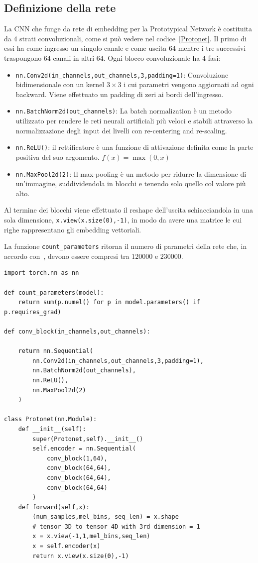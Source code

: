 \documentclass[12pt,a4paper,titlepage]{article}
\begin{document}
\subsection{Definizione della rete}
\label{subsec:definizione_protonet}
La CNN che funge da rete di embedding per la Prototypical Network è costituita da 4 strati convoluzionali, come si può vedere nel codice~\ref{Protonet}. Il primo di essi ha come ingresso un singolo canale e come uscita 64 mentre i tre successivi traspongono 64 canali in altri 64.
Ogni blocco convoluzionale ha 4 fasi:
\begin{itemize}
	\item \texttt{nn.Conv2d(in\_channels,out\_channels,3,padding=1)}: Convoluzione bidimensionale con un kernel $3\times3$ i cui parametri vengono aggiornati ad ogni backward. Viene effettuato un padding di zeri ai bordi dell'ingresso.
	\item \texttt{nn.BatchNorm2d(out\_channels)}: La batch normalization è un metodo utilizzato per rendere le reti neurali artificiali più veloci e stabili attraverso la normalizzazione degli input dei livelli con re-centering and re-scaling.
	\item \texttt{nn.ReLU()}: il rettificatore è una funzione di attivazione definita come la parte positiva del suo argomento. $f(x)=\max(0,x)$
	\item \texttt{nn.MaxPool2d(2)}: Il max-pooling è un metodo per ridurre la dimensione di un’immagine, suddividendola in blocchi e tenendo solo quello col valore più alto.
\end{itemize}
Al termine dei blocchi viene effettuato il reshape dell'uscita schiacciandola in una sola dimensione, \texttt{x.view(x.size(0),-1)}, in modo da avere una matrice le cui righe rappresentano gli embedding vettoriali.

La funzione \texttt{count\_parameters} ritorna il numero di parametri della rete che, in accordo con~\cite{salamon:Few-Shot}, devono essere compresi tra $120000$ e $230000$.

\begin{lstlisting}[language=iPython,firstnumber=1, caption=protonet.py, label= Protonet,captionpos=b]
import torch.nn as nn

def count_parameters(model):
    return sum(p.numel() for p in model.parameters() if p.requires_grad)

def conv_block(in_channels,out_channels):

    return nn.Sequential(
        nn.Conv2d(in_channels,out_channels,3,padding=1),
        nn.BatchNorm2d(out_channels),
        nn.ReLU(),
        nn.MaxPool2d(2)
    )

class Protonet(nn.Module):
    def __init__(self):
        super(Protonet,self).__init__()
        self.encoder = nn.Sequential(
            conv_block(1,64),
            conv_block(64,64),
            conv_block(64,64),
            conv_block(64,64)
        )
    def forward(self,x):
        (num_samples,mel_bins, seq_len) = x.shape
        # tensor 3D to tensor 4D with 3rd dimension = 1
        x = x.view(-1,1,mel_bins,seq_len) 
        x = self.encoder(x)
        return x.view(x.size(0),-1)
\end{lstlisting}
\end{document}
